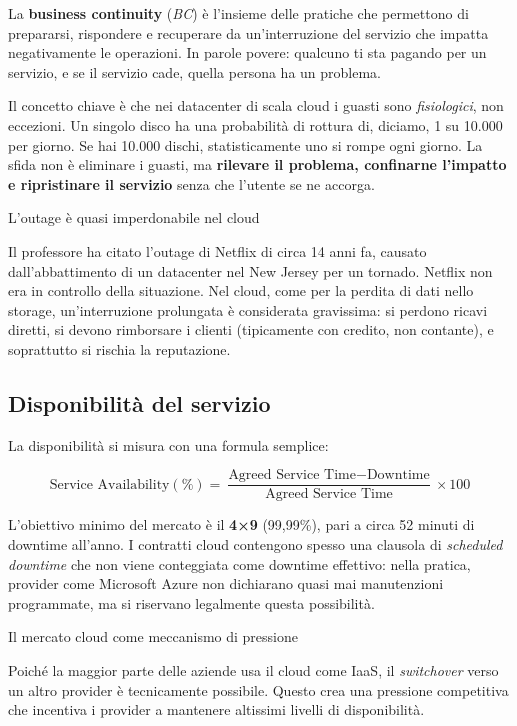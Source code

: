 \documentclass[
  italian,
  openany]{book}
\begin{document}
La \textbf{business continuity} (\emph{BC}) è l'insieme delle pratiche
che permettono di prepararsi, rispondere e recuperare da un'interruzione
del servizio che impatta negativamente le operazioni. In parole povere:
qualcuno ti sta pagando per un servizio, e se il servizio cade, quella
persona ha un problema.

Il concetto chiave è che nei datacenter di scala cloud i guasti sono
\emph{fisiologici}, non eccezioni. Un singolo disco ha una probabilità
di rottura di, diciamo, 1 su 10.000 per giorno. Se hai 10.000 dischi,
statisticamente uno si rompe ogni giorno. La sfida non è eliminare i
guasti, ma \textbf{rilevare il problema, confinarne l'impatto e
ripristinare il servizio} senza che l'utente se ne accorga.

\begin{calloutwarning}{L’outage è quasi imperdonabile nel cloud}

Il professore ha citato l'outage di Netflix di circa 14 anni fa, causato
dall'abbattimento di un datacenter nel New Jersey per un tornado.
Netflix non era in controllo della situazione. Nel cloud, come per la
perdita di dati nello storage, un'interruzione prolungata è considerata
gravissima: si perdono ricavi diretti, si devono rimborsare i clienti
(tipicamente con credito, non contante), e soprattutto si rischia la
reputazione.

\end{calloutwarning}

\subsection{Disponibilità del
servizio}\label{disponibilituxe0-del-servizio}

La disponibilità si misura con una formula semplice:

\[
\text{Service Availability} (\%) = \frac{\text{Agreed Service Time} - \text{Downtime}}{\text{Agreed Service Time}} \times 100
\]

L'obiettivo minimo del mercato è il \textbf{4×9} (99,99\%), pari a circa
52 minuti di downtime all'anno. I contratti cloud contengono spesso una
clausola di \emph{scheduled downtime} che non viene conteggiata come
downtime effettivo: nella pratica, provider come Microsoft Azure non
dichiarano quasi mai manutenzioni programmate, ma si riservano
legalmente questa possibilità.

\begin{calloutnote}{Il mercato cloud come meccanismo di pressione}

Poiché la maggior parte delle aziende usa il cloud come IaaS, il
\emph{switchover} verso un altro provider è tecnicamente possibile.
Questo crea una pressione competitiva che incentiva i provider a
mantenere altissimi livelli di disponibilità.

\end{calloutnote}
\end{document}

